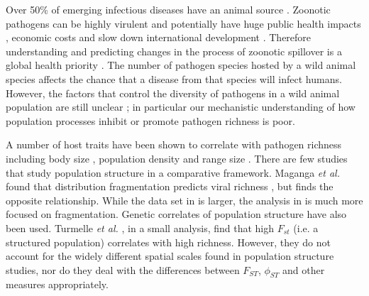 Over 50\% of emerging infectious diseases have an animal source \cite{jones2008global, smith2014global}.
Zoonotic pathogens can be highly virulent \cite{luby2009recurrent, lefebvre2014case} and potentially have huge public health impacts \cite{granich2015trends}, economic costs \cite{knobler2004learning} and slow down international development \cite{ebolaWorldbank}.
Therefore understanding and predicting changes in the process of zoonotic spillover is a global health priority \cite{taylor2001risk}.
The number of pathogen species hosted by a wild animal species affects the chance that a disease from that species will infect humans.
However, the factors that control the diversity of pathogens in a wild animal population are still unclear \cite{metcalf2015five}; in particular our mechanistic understanding of how population processes inhibit or promote pathogen richness is poor.






A number of host traits have been shown to correlate with pathogen richness including body size \cite{kamiya2014determines, arneberg2002host}, population density \cite{nunn2003comparative, arneberg2002host} and range size \cite{bordes2011impact, kamiya2014determines}.
There are few studies that study population structure in a comparative framework.
Maganga \emph{et al.} found that distribution fragmentation predicts viral richness \cite{maganga2014bat}, but \cite{gay2014parasite} finds the opposite relationship. 
While the data set in \cite{gay2014parasite} is larger, the analysis in \cite{maganga2014bat} is much more focused on fragmentation.
Genetic correlates of population structure have also been used.
Turmelle \emph{et al.} \cite{turmelle2009correlates}, in a small analysis, find that high $F_{st}$ (i.e. a structured population) correlates with high richness.
However, they do not account for the widely different spatial scales found in population structure studies, nor do they deal with the differences between $F_{ST}$, $\phi_{ST}$ and other measures appropriately. 

